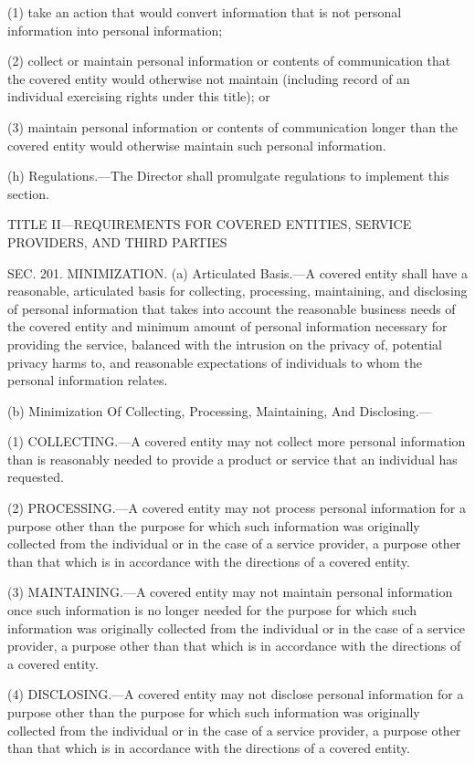 (1) take an action that would convert information that is not personal information into personal information;

(2) collect or maintain personal information or contents of communication that the covered entity would otherwise not maintain (including record of an individual exercising rights under this title); or

(3) maintain personal information or contents of communication longer than the covered entity would otherwise maintain such personal information.

(h) Regulations.—The Director shall promulgate regulations to implement this section.

TITLE II—REQUIREMENTS FOR COVERED ENTITIES, SERVICE PROVIDERS, AND THIRD PARTIES

SEC. 201. MINIMIZATION.
(a) Articulated Basis.—A covered entity shall have a reasonable, articulated basis for collecting, processing, maintaining, and disclosing of personal information that takes into account the reasonable business needs of the covered entity and minimum amount of personal information necessary for providing the service, balanced with the intrusion on the privacy of, potential privacy harms to, and reasonable expectations of individuals to whom the personal information relates.

(b) Minimization Of Collecting, Processing, Maintaining, And Disclosing.—

(1) COLLECTING.—A covered entity may not collect more personal information than is reasonably needed to provide a product or service that an individual has requested.

(2) PROCESSING.—A covered entity may not process personal information for a purpose other than the purpose for which such information was originally collected from the individual or in the case of a service provider, a purpose other than that which is in accordance with the directions of a covered entity.

(3) MAINTAINING.—A covered entity may not maintain personal information once such information is no longer needed for the purpose for which such information was originally collected from the individual or in the case of a service provider, a purpose other than that which is in accordance with the directions of a covered entity.

(4) DISCLOSING.—A covered entity may not disclose personal information for a purpose other than the purpose for which such information was originally collected from the individual or in the case of a service provider, a purpose other than that which is in accordance with the directions of a covered entity.

